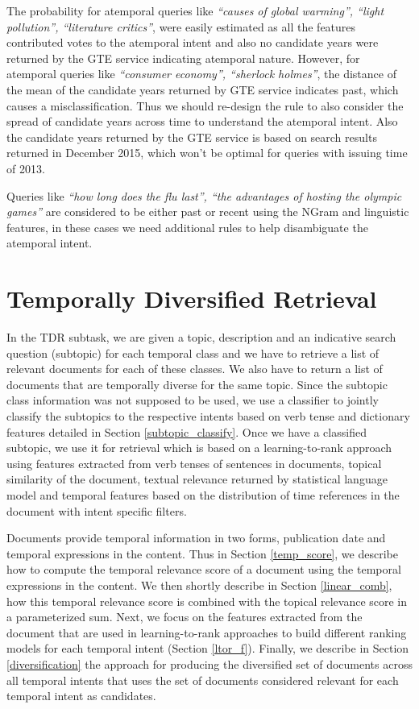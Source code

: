\documentclass{sig-alternate}
\begin{document}
The probability for atemporal queries like \textit{``causes of global warming'', ``light pollution'', ``literature critics''}, were easily estimated as all the features contributed votes to the atemporal intent and also no candidate years were returned by the \textsf{GTE service} indicating atemporal nature. However, for atemporal queries like \textit{``consumer economy'', ``sherlock holmes''}, the distance of the mean of the candidate years returned by \textsf{GTE service} indicates past, which causes a misclassification. Thus we should re-design the rule to also consider the spread of candidate years across time to understand the atemporal intent. Also the candidate years returned by the \textsf{GTE service} is based on search results returned in December 2015, which won't be optimal for queries with issuing time of 2013.

Queries like \textit{``how long does the flu last'', ``the advantages of hosting the olympic games''} are considered to be either past or recent using the \textsf{NGram} and \textsf{linguistic} features, in these cases we need additional rules to help disambiguate the atemporal intent. 

\section{Temporally Diversified Retrieval}\label{TDR}
In the TDR subtask, we are given a topic, description and an indicative search question (subtopic) for each temporal class and we have to retrieve a list of relevant documents for each of these classes. We also have to return a list of documents that are temporally diverse for the same topic. Since the subtopic class information was not supposed to be used, we use a classifier to jointly classify the subtopics to the respective intents based on verb tense and dictionary features detailed in Section \ref{subtopic_classify}. Once we have a classified subtopic, we use it for retrieval which is based on a \textsf{learning-to-rank} approach using features extracted from verb tenses of sentences in documents, topical similarity of the document, textual relevance returned by statistical language model and temporal features based on the distribution of time references in the document with intent specific filters.

Documents provide temporal information in two forms, publication date and temporal expressions in the content. Thus in Section \ref{temp_score}, we describe how to compute the temporal relevance score of a document using the temporal expressions in the content. We then shortly describe in Section \ref{linear_comb}, how this temporal relevance score is combined with the topical relevance score in a parameterized sum. Next, we focus on the features extracted from the document that are used in learning-to-rank approaches to build different ranking models for each temporal intent (Section \ref{ltor_f}). Finally, we describe in Section \ref{diversification} the approach for producing the diversified set of documents across all temporal intents that uses the set of documents considered relevant for each temporal intent as candidates. 
\end{document}
